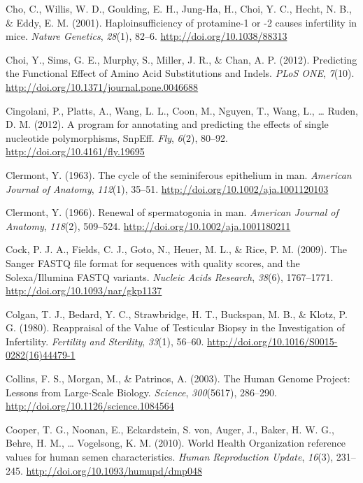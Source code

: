 \documentclass[12pt,twoside]{reedthesis}
\theoremstyle{definition}
\theoremstyle{definition}
\theoremstyle{remark}
\begin{document}
  \hypertarget{ref-Cho2001}{}
  Cho, C., Willis, W. D., Goulding, E. H., Jung-Ha, H., Choi, Y. C.,
  Hecht, N. B., \& Eddy, E. M. (2001). Haploinsufficiency of protamine-1
  or -2 causes infertility in mice. \emph{Nature Genetics}, \emph{28}(1),
  82--6. \url{http://doi.org/10.1038/88313}
  
  \hypertarget{ref-Choi2012}{}
  Choi, Y., Sims, G. E., Murphy, S., Miller, J. R., \& Chan, A. P. (2012).
  Predicting the Functional Effect of Amino Acid Substitutions and Indels.
  \emph{PLoS ONE}, \emph{7}(10).
  \url{http://doi.org/10.1371/journal.pone.0046688}
  
  \hypertarget{ref-Cingolani2012}{}
  Cingolani, P., Platts, A., Wang, L. L., Coon, M., Nguyen, T., Wang, L.,
  \ldots{} Ruden, D. M. (2012). A program for annotating and predicting
  the effects of single nucleotide polymorphisms, SnpEff. \emph{Fly},
  \emph{6}(2), 80--92. \url{http://doi.org/10.4161/fly.19695}
  
  \hypertarget{ref-Clermont1963}{}
  Clermont, Y. (1963). The cycle of the seminiferous epithelium in man.
  \emph{American Journal of Anatomy}, \emph{112}(1), 35--51.
  \url{http://doi.org/10.1002/aja.1001120103}
  
  \hypertarget{ref-Clermont1966}{}
  Clermont, Y. (1966). Renewal of spermatogonia in man. \emph{American
  Journal of Anatomy}, \emph{118}(2), 509--524.
  \url{http://doi.org/10.1002/aja.1001180211}
  
  \hypertarget{ref-Cock2009}{}
  Cock, P. J. A., Fields, C. J., Goto, N., Heuer, M. L., \& Rice, P. M.
  (2009). The Sanger FASTQ file format for sequences with quality scores,
  and the Solexa/Illumina FASTQ variants. \emph{Nucleic Acids Research},
  \emph{38}(6), 1767--1771. \url{http://doi.org/10.1093/nar/gkp1137}
  
  \hypertarget{ref-Colgan1980}{}
  Colgan, T. J., Bedard, Y. C., Strawbridge, H. T., Buckspan, M. B., \&
  Klotz, P. G. (1980). Reappraisal of the Value of Testicular Biopsy in
  the Investigation of Infertility. \emph{Fertility and Sterility},
  \emph{33}(1), 56--60. \url{http://doi.org/10.1016/S0015-0282(16)44479-1}
  
  \hypertarget{ref-Collins2003}{}
  Collins, F. S., Morgan, M., \& Patrinos, A. (2003). The Human Genome
  Project: Lessons from Large-Scale Biology. \emph{Science},
  \emph{300}(5617), 286--290. \url{http://doi.org/10.1126/science.1084564}
  
  \hypertarget{ref-Cooper2010}{}
  Cooper, T. G., Noonan, E., Eckardstein, S. von, Auger, J., Baker, H. W.
  G., Behre, H. M., \ldots{} Vogelsong, K. M. (2010). World Health
  Organization reference values for human semen characteristics.
  \emph{Human Reproduction Update}, \emph{16}(3), 231--245.
  \url{http://doi.org/10.1093/humupd/dmp048}
  
\end{document}

